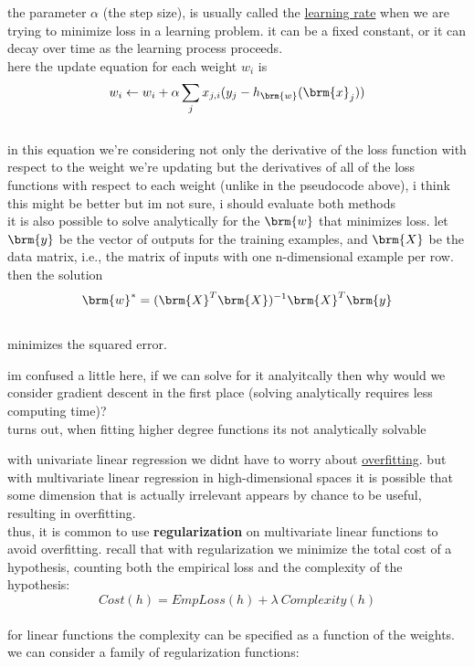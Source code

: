 \documentclass[a4paper,12pt]{article}
\begin{document}
the parameter \(\alpha\) (the step size), is usually called the \href{20230423002354-learning_rate.org}{learning rate} when we are trying to minimize loss in a learning problem. it can be a fixed constant, or it can decay over time as the learning process proceeds.\\
here the update equation for each weight \(w_i\) is\\
\[
w_i \gets w_i + \alpha \sum_{j} x_{j,i}(y_j-h_{\brm{w}}(\brm{x}_j))
\]\\
in this equation we're considering not only the derivative of the loss function with respect to the weight we're updating but the derivatives of all of the loss functions with respect to each weight (unlike in the pseudocode above), i think this might be better but im not sure, i should evaluate both methods\\
it is also possible to solve analytically for the \(\brm{w}\) that minimizes loss. let \(\brm{y}\) be the vector of outputs for the training examples, and \(\brm{X}\) be the data matrix, i.e., the matrix of inputs with one n-dimensional example per row. then the solution\\
\[
\brm{w}^* = (\brm{X}^T\brm{X})^{-1}\brm{X}^T\brm{y}
\]\\
minimizes the squared error.\\
\begin{note}
im confused a little here, if we can solve for it analyitcally then why would we consider gradient descent in the first place (solving analytically requires less computing time)?\\
turns out, when fitting higher degree functions its not analytically solvable\\
\end{note}
with univariate linear regression we didnt have to worry about \href{20230420220702-overfitting.org}{overfitting}. but with multivariate linear regression in high-dimensional spaces it is possible that some dimension that is actually irrelevant appears by chance to be useful, resulting in overfitting.\\
thus, it is common to use \textbf{regularization} on multivariate linear functions to avoid overfitting. recall that with regularization we minimize the total cost of a hypothesis, counting both the empirical loss and the complexity of the hypothesis:\\
\[
Cost(h) = EmpLoss(h) + \lambda\ Complexity(h)
\]\\
for linear functions the complexity can be specified as a function of the weights. we can consider a family of regularization functions:\\
\end{document}
